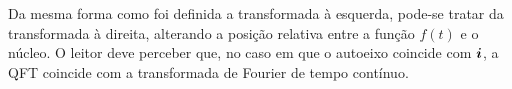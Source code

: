 %
%
%
%
%
%

Da mesma forma como foi definida a transformada \`a esquerda, pode-se tratar da transformada \`a direita, alterando a posi\c c\~ao relativa entre a fun\c c\~ao $ f(t) $ e o n\'ucleo. O leitor deve perceber que, no caso em que o autoeixo coincide com $ \boldsymbol{i} $, a QFT coincide com a transformada de Fourier de tempo
cont\'inuo.

